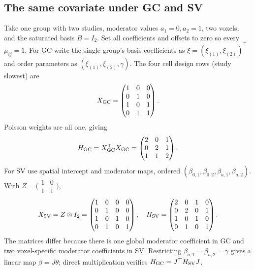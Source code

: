 \documentclass[11pt,a4paper]{article}
\numberwithin{equation}{section}
\begin{document}
\subsection{The same covariate under GC and SV}
Take one group with two studies, moderator values $a_1=0,a_2=1$, two voxels,
and the saturated basis $B=I_2$.
Set all coefficients and offsets to zero so every $\mu_{ij}=1$.
For GC write the single group's basis coefficients as
$\xi=(\xi_{(1)},\xi_{(2)})^\top$ and order parameters as
$(\xi_{(1)},\xi_{(2)},\gamma)$.
The four cell design rows (study slowest) are
\[
 X_{\rm GC}=
 \begin{pmatrix}1&0&0\\0&1&0\\1&0&1\\0&1&1\end{pmatrix}.
\]
Poisson weights are all one, giving
\[
 H_{\rm GC}=X_{\rm GC}^\top X_{\rm GC}
 =\begin{pmatrix}2&0&1\\0&2&1\\1&1&2\end{pmatrix}.
\]
For SV use spatial intercept and moderator maps, ordered
$(\beta_{0,1},\beta_{0,2},\beta_{a,1},\beta_{a,2})$.
With $Z=\bigl(\begin{smallmatrix}1&0\\1&1\end{smallmatrix}\bigr)$,
\[
 X_{\rm SV}=Z\otimes I_2
 =\begin{pmatrix}1&0&0&0\\0&1&0&0\\1&0&1&0\\0&1&0&1\end{pmatrix},
 \quad
 H_{\rm SV}=
 \begin{pmatrix}2&0&1&0\\0&2&0&1\\1&0&1&0\\0&1&0&1\end{pmatrix}.
\]
The matrices differ because there is one global moderator coefficient
in GC and two voxel-specific moderator coefficients in SV.
Restricting $\beta_{a,1}=\beta_{a,2}=\gamma$ gives a linear map
$\beta=J\theta$; direct multiplication verifies
$H_{\rm GC}=J^\top H_{\rm SV}J$.
\end{document}
